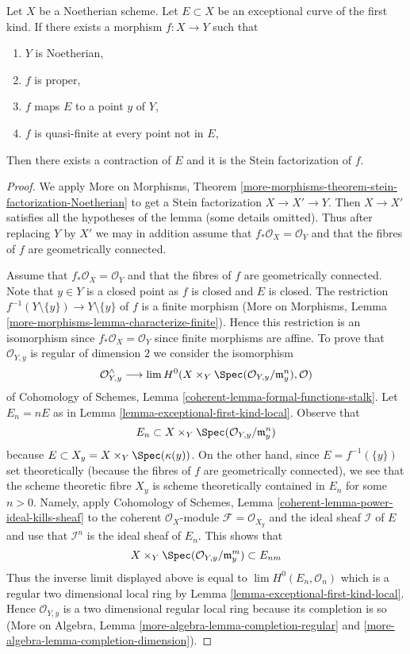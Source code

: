 \begin{lemma}
\label{lemma-contraction}
Let $X$ be a Noetherian scheme. Let $E \subset X$ be an
exceptional curve of the first kind. If there exists a morphism
$f : X \to Y$ such that
\begin{enumerate}
\item $Y$ is Noetherian,
\item $f$ is proper,
\item $f$ maps $E$ to a point $y$ of $Y$,
\item $f$ is quasi-finite at every point not in $E$,
\end{enumerate}
Then there exists a contraction of $E$ and it is the Stein
factorization of $f$.
\end{lemma}

\begin{proof}
We apply More on Morphisms, Theorem
\ref{more-morphisms-theorem-stein-factorization-Noetherian}
to get a Stein factorization $X \to X' \to Y$.
Then $X \to X'$ satisfies all the hypotheses of
the lemma (some details omitted).
Thus after replacing $Y$ by $X'$ we may in addition
assume that $f_*\mathcal{O}_X = \mathcal{O}_Y$ and
that the fibres of $f$ are geometrically connected.

\medskip\noindent
Assume that $f_*\mathcal{O}_X = \mathcal{O}_Y$ and
that the fibres of $f$ are geometrically connected.
Note that $y \in Y$ is a closed point as $f$ is closed and $E$ is closed.
The restriction $f^{-1}(Y \setminus \{y\}) \to Y \setminus \{y\}$
of $f$ is a finite morphism
(More on Morphisms, Lemma \ref{more-morphisms-lemma-characterize-finite}).
Hence this restriction is an isomorphism since
$f_*\mathcal{O}_X = \mathcal{O}_Y$ since finite morphisms are affine.
To prove that $\mathcal{O}_{Y, y}$ is regular of dimension
$2$ we consider the isomorphism
$$
\mathcal{O}_{Y, y}^\wedge \longrightarrow
\lim H^0(X \times_Y \Spec(\mathcal{O}_{Y, y}/\mathfrak m_y^n), \mathcal{O})
$$
of Cohomology of Schemes, Lemma \ref{coherent-lemma-formal-functions-stalk}.
Let $E_n = nE$ as in Lemma \ref{lemma-exceptional-first-kind-local}.
Observe that
$$
E_n \subset X \times_Y \Spec(\mathcal{O}_{Y, y}/\mathfrak m_y^n)
$$
because $E \subset X_y = X \times_Y \Spec(\kappa(y))$.
On the other hand, since $E = f^{-1}(\{y\})$ set theoretically
(because the fibres of $f$ are geometrically connected), we see that
the scheme theoretic fibre $X_y$ is scheme theoretically contained in
$E_n$ for some $n > 0$. Namely, apply
Cohomology of Schemes, Lemma \ref{coherent-lemma-power-ideal-kills-sheaf}
to the coherent $\mathcal{O}_X$-module $\mathcal{F} = \mathcal{O}_{X_y}$
and the ideal sheaf $\mathcal{I}$ of $E$ and use that
$\mathcal{I}^n$ is the ideal sheaf of $E_n$. This shows that
$$
X \times_Y \Spec(\mathcal{O}_{Y, y}/\mathfrak m_y^m) \subset E_{nm}
$$
Thus the inverse limit displayed above is equal to
$\lim H^0(E_n, \mathcal{O}_n)$
which is a regular two dimensional local ring by
Lemma \ref{lemma-exceptional-first-kind-local}.
Hence $\mathcal{O}_{Y, y}$ is a two dimensional regular local
ring because its completion is so
(More on Algebra, Lemma \ref{more-algebra-lemma-completion-regular} and
\ref{more-algebra-lemma-completion-dimension}).


\end{proof}
